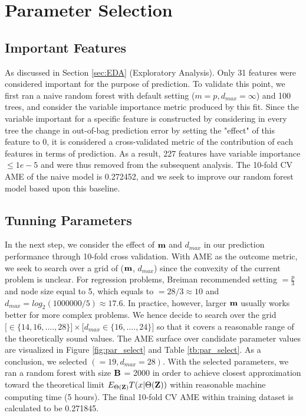 \documentclass[11pt]{article}
\theoremstyle{definition}
\begin{document}
\section{\textbf{Parameter Selection}}
\subsection{\textbf{Important Features}}

As discussed in Section \ref{sec:EDA} (Exploratory Analysis). Only 31 features were considered important for the purpose of prediction. To validate this point, we first ran a naive random forest with default setting ($m = p, d_{max} = \infty$) and 100 trees, and consider the variable importance metric produced by this fit. Since the variable important for a specific feature  is constructed by considering in every tree the change in out-of-bag prediction error by setting the "effect" of this feature to 0, it is considered a cross-validated metric of the contribution of each features in terms of prediction. As a result, 227 features have variable importance $\leq 1e-5$ and were thus removed from the subsequent analysis. The 10-fold CV AME of the naive model is 0.272452, and we seek to improve our random forest model based upon this baseline.

\subsection{\textbf{Tunning Parameters}}
In the next step, we consider the effect of ${\bf m}$ and $d_{max}$ in our prediction performance through 10-fold cross validation. With AME as the outcome metric, we seek to search over a grid of (${\bf m}$, $d_{max}$) since the convexity of the current problem is unclear. For regression problems, Breiman recommended setting $\bm = \frac{p}{3}$ and node size equal to 5, which equals to $\bm = 28/3 \approx 10$ and $d_{max} = log_2(1000000/5) \approx 17.6$. In practice, however, larger ${\bf m}$ usually works better for more complex problems. We hence decide to search over the grid $\big[ \bm \in \{14, 16, ...., 28\} \big] \times \big[ d_{max} \in \{16, ...., 24\} \big]$ so that it covers a reasonable range of the theoretically sound values. The AME surface over candidate parameter values are visualized in Figure \ref{fig:par_select} and Table \ref{tb:par_select}. As a conclusion, we selected $(\bm = 19, d_{max} = 28)$. With the selected parameters, we ran a random forest with size ${\bf B}$ = 2000 in order to achieve closest approximation toward the theoretical limit $E_{\Theta({\bf Z})}T(x|\Theta({\bf Z}))$ within reasonable machine computing time (5 hours). The final 10-fold CV AME within training dataset is calculated to be 0.271845.
\end{document}
